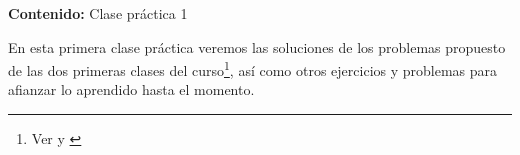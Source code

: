 {\Large
    \textbf{Contenido:} Clase práctica 1
}

En esta primera clase práctica veremos las soluciones de los 
problemas propuesto de las dos primeras clases del curso\footnote{Ver \cite{TD23-clase1} y \cite{TD23-clase2}},
así como otros ejercicios y problemas para afianzar lo aprendido hasta el momento.
